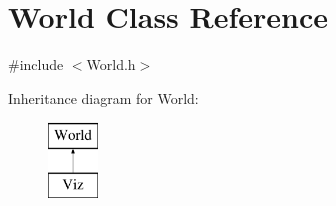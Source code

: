 \hypertarget{classWorld}{}\section{World Class Reference}
\label{classWorld}


{\ttfamily \#include $<$World.\+h$>$}

Inheritance diagram for World\+:\begin{figure}[H]
\begin{center}
\leavevmode
\includegraphics[height=2.000000cm]{classWorld}
\end{center}
\end{figure}
